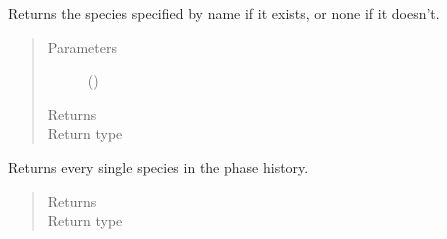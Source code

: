\documentclass[letterpaper,10pt,openany,oneside,english]{sphinxmanual}
\begin{document}
\begin{fulllineitems}
\begin{fulllineitems}
\begin{quote}
\begin{description}
\end{description}\end{quote}

\end{fulllineitems}


\begin{fulllineitems}
\label{\detokenize{support_rst/phase:phase.Phase.GetSpecie}}
Returns the species specified by name if it exists, or none if it
doesn’t.
\begin{quote}\begin{description}
\item[{Parameters}] \leavevmode
{} () \textendash{} 

\item[{Returns}] \leavevmode
{}

\item[{Return type}] \leavevmode
{}

\end{description}\end{quote}

\end{fulllineitems}


\begin{fulllineitems}
\label{\detokenize{support_rst/phase:phase.Phase.GetSpecies}}
Returns every single species in the phase history.
\begin{quote}\begin{description}
\item[{Returns}] \leavevmode
{}

\item[{Return type}] \leavevmode
{}

\end{description}\end{quote}

\end{fulllineitems}


\end{fulllineitems}
\end{document}
